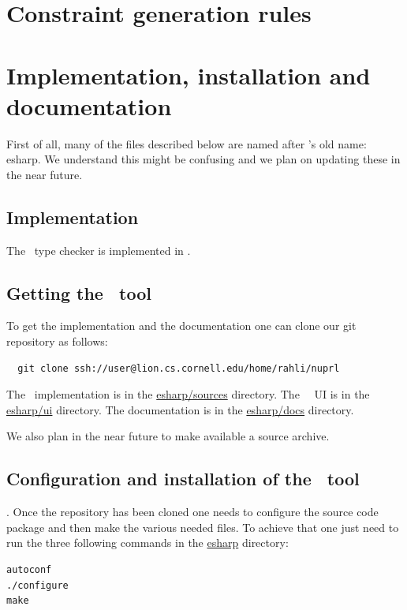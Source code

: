 \documentclass[final]{article}
\begin{document}


\section{Constraint generation rules}


\section{Implementation, installation and documentation}


First of all, many of the files described below are named after \eml's
old name: esharp.  We understand this might be confusing and we plan
on updating these in the near future.

\subsection{Implementation}

%
The \eml\ type checker is implemented in \SML.


\subsection{Getting the \eml\ tool}


%
To get the implementation and the documentation one can clone our git
repository as follows:
\begin{center}
\begin{verbatim}
  git clone ssh://user@lion.cs.cornell.edu/home/rahli/nuprl
\end{verbatim}
\end{center}
The \eml\ implementation is in the \url{esharp/sources} directory.
The \eml\ \emacs\ UI is in the \url{esharp/ui} directory.
The documentation is in the \url{esharp/docs} directory.


%
We also plan in the near future to make available a source archive.


\subsection{Configuration and installation of the \eml\ tool}


.
%
Once the repository has been cloned one needs to configure the source
code package and then make the various needed files.  To achieve that
one just need to run the three following commands in the \url{esharp}
directory:
\begin{center}
\begin{verbatim}
autoconf
./configure
make
\end{verbatim}
\end{center}
\end{document}
